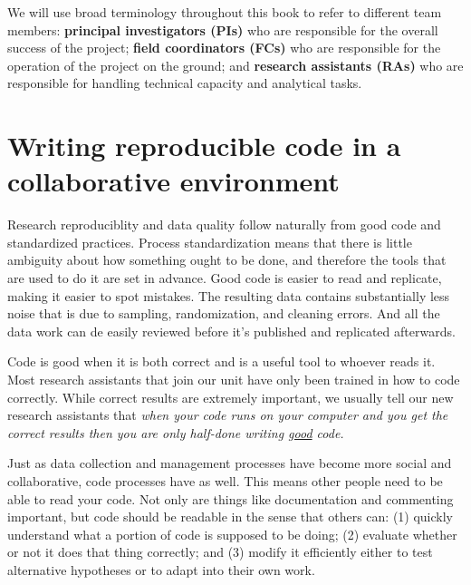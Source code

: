 We will use broad terminology throughout this book
to refer to different team members:
\textbf{principal investigators (PIs)} who are responsible for
the overall success of the project;
\textbf{field coordinators (FCs)} who are responsible for
the operation of the project on the ground;
and \textbf{research assistants (RAs)} who are responsible for
handling technical capacity and analytical tasks.

\section{Writing reproducible code in a collaborative environment}

Research reproduciblity and data quality follow naturally from
good code and standardized practices.
Process standardization means that there is
little ambiguity about how something ought to be done,
and therefore the tools that are used to do it are set in advance.
Good code is easier to read and replicate, making it easier to spot mistakes.
The resulting data contains substantially less noise
that is due to sampling, randomization, and cleaning errors. And all the data work can de easily reviewed before it's published and replicated afterwards.

Code is good when it is both correct and is a useful tool to whoever reads it.
Most research assistants that join our unit have only been trained in how to code correctly.
While correct results are extremely important, we usually tell our new research assistants that
\textit{when your code runs on your computer and you get the correct results then you are only half-done writing \underline{good} code.}

Just as data collection and management processes have become more social and collaborative,
code processes have as well. This means other people need to be able to read your code.
Not only are things like documentation and commenting important,
but code should be readable in the sense that others can:
(1) quickly understand what a portion of code is supposed to be doing;
(2) evaluate whether or not it does that thing correctly; and
(3) modify it efficiently either to test alternative hypotheses
or to adapt into their own work.


